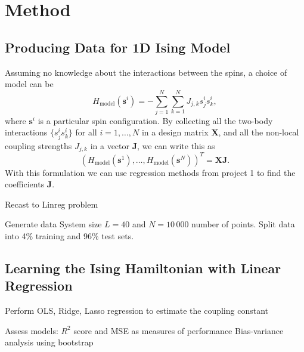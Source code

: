 \section{Method}\label{sec:Method}

\subsection{Producing Data for 1D Ising Model}\label{sec:method datagen}
Assuming no knowledge about the interactions between the spins, a choice of model can be
\begin{equation}\label{eq:general}
    H_{\text{model}}(\mathbf{s}^i) = -\sum_{j=1}^N\sum_{k=1}^N J_{j,k}s_j^is_k^i,
\end{equation}
where $\mathbf{s}^i$ is a particular spin configuration. By collecting all the two-body interactions $\{s_j^is_k^i\}$ for all $i=1,\ldots,N$ in a design matrix $\mathbf{X}$, and all the non-local coupling strengths $J_{j,k}$ in a vector $\mathbf{J}$, we can write this as
\begin{equation*}
    (H_{\text{model}}(\mathbf{s}^1), \ldots, H_{\text{model}}(\mathbf{s}^N))^T = \mathbf{X}\mathbf{J}.
\end{equation*}
With this formulation we can use regression methods from project 1 to find the coefficients $\mathbf{J}$.


Recast to Linreg problem 

Generate data
System size $L=40$ and $N=10\,000$ number of points. 
Split data into 4\% training and 96\% test sets.


\subsection{Learning the Ising Hamiltonian with Linear Regression}\label{sec:method linreg}
Perform OLS, Ridge, Lasso regression to estimate the coupling constant

Assess models: 
$R^2$ score and MSE as measures of performance
Bias-variance analysis using bootstrap

